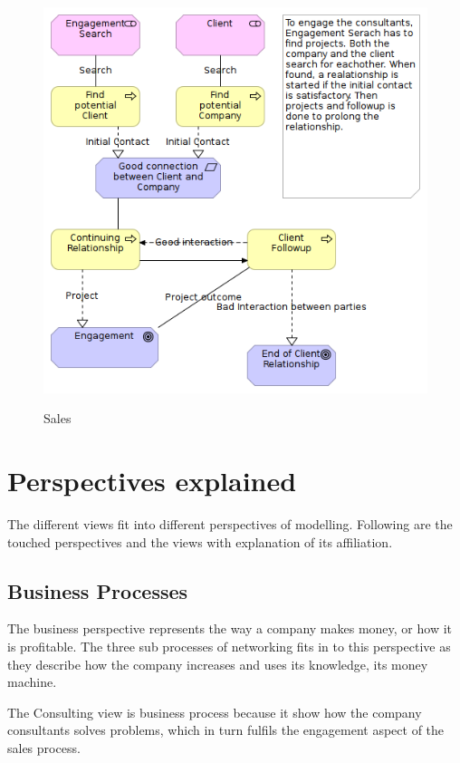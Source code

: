 \documentclass[12pt, a4paper]{article}
\begin{document}
\begin{figure}[htb]
    \centering
    \includegraphics[width=\textwidth]{Sales} 
    \label{fig:Sales}
    \caption{Sales}
\end{figure}

\section{Perspectives explained}
The different views fit into different perspectives of modelling. Following are
the touched perspectives and the views with explanation of its affiliation. 

\subsection{Business Processes}
The business perspective represents the way a company makes money, or how it is
profitable. The three sub processes of networking fits in to this perspective as
they describe how the company increases and uses its knowledge, its money
machine.

The Consulting view is business process because it show how the company
consultants solves problems, which in turn fulfils the engagement aspect of the
sales process. 
\end{document}
